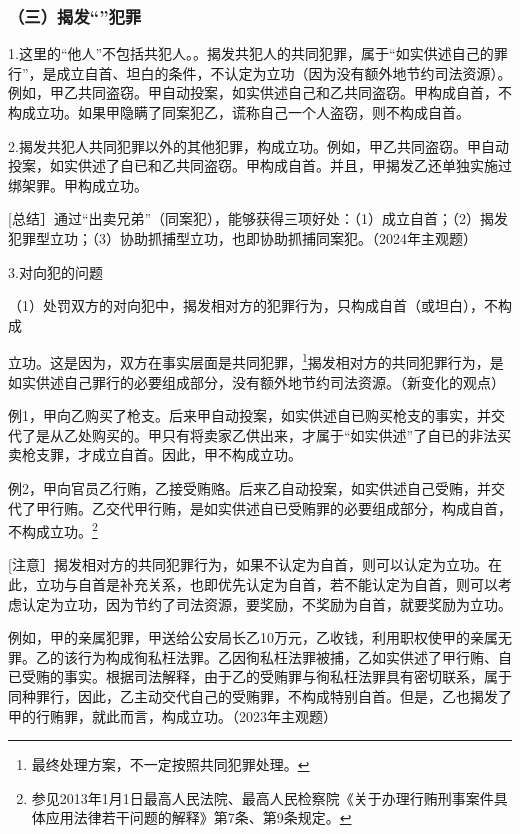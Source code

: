 \subsubsection*{（三）揭发“”犯罪}

1.这里的“他人”不包括共犯人。。揭发共犯人的共同犯罪，属于“如实供述自己的罪行”，是成立自首、坦白的条件，不认定为立功（因为没有额外地节约司法资源）。例如，甲乙共同盗窃。甲自动投案，如实供述自己和乙共同盗窃。甲构成自首，不构成立功。如果甲隐瞒了同案犯乙，谎称自己一个人盗窃，则不构成自首。

2.揭发共犯人共同犯罪以外的其他犯罪，构成立功。例如，甲乙共同盗窃。甲自动投案，如实供述了自已和乙共同盗窃。甲构成自首。并且，甲揭发乙还单独实施过绑架罪。甲构成立功。

[总结］通过“出卖兄弟”（同案犯），能够获得三项好处：（1）成立自首；（2）揭发犯罪型立功；（3）协助抓捕型立功，也即协助抓捕同案犯。（2024年主观题）

3.对向犯的问题

（1）处罚双方的对向犯中，揭发相对方的犯罪行为，只构成自首（或坦白），不构成

立功。这是因为，双方在事实层面是共同犯罪，\footnote{最终处理方案，不一定按照共同犯罪处理。}揭发相对方的共同犯罪行为，是如实供述自己罪行的必要组成部分，没有额外地节约司法资源。（新变化的观点）

例1，甲向乙购买了枪支。后来甲自动投案，如实供述自已购买枪支的事实，并交代了是从乙处购买的。甲只有将卖家乙供出来，才属于“如实供述”了自已的非法买卖枪支罪，才成立自首。因此，甲不构成立功。

例2，甲向官员乙行贿，乙接受贿赂。后来乙自动投案，如实供述自己受贿，并交代了甲行贿。乙交代甲行贿，是如实供述自已受贿罪的必要组成部分，构成自首，不构成立功。\footnote{参见2013年1月1日最高人民法院、最高人民检察院《关于办理行贿刑事案件具体应用法律若干问题的解释》第7条、第9条规定。}

[注意］揭发相对方的共同犯罪行为，如果不认定为自首，则可以认定为立功。在此，立功与自首是补充关系，也即优先认定为自首，若不能认定为自首，则可以考虑认定为立功，因为节约了司法资源，要奖励，不奖励为自首，就要奖励为立功。

例如，甲的亲属犯罪，甲送给公安局长乙10万元，乙收钱，利用职权使甲的亲属无罪。乙的该行为构成徇私枉法罪。乙因徇私枉法罪被捕，乙如实供述了甲行贿、自已受贿的事实。根据司法解释，由于乙的受贿罪与徇私枉法罪具有密切联系，属于同种罪行，因此，乙主动交代自己的受贿罪，不构成特别自首。但是，乙也揭发了甲的行贿罪，就此而言，构成立功。（2023年主观题）

